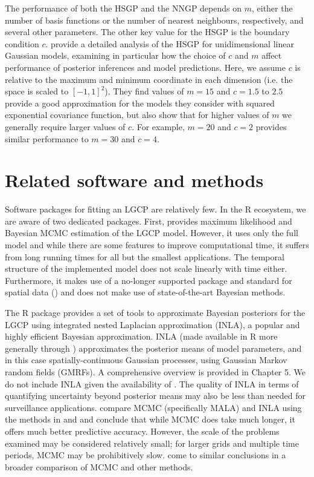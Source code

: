 The performance of both the HSGP and the NNGP depends on $m$, either the number of basis functions or the number of nearest neighbours, respectively, and several other parameters. The other key value for the HSGP is the boundary condition $c$. \citet{Riutort2023} provide a detailed analysis of the HSGP for unidimensional linear Gaussian models, examining in particular how the choice of $c$ and $m$ affect performance of posterior inferences and model predictions. Here, we assume $c$ is relative to the maximum and minimum coordinate in each dimension (i.e. the space is scaled to $[-1,1]^2$). They find values of $m=15$ and $c=1.5$ to $2.5$ provide a good approximation for the models they consider with squared exponential covariance function, but also show that for higher values of $m$ we generally require larger values of $c$. For example, $m=20$ and $c=2$ provides similar performance to $m=30$ and $c=4$. 

\section{Related software and methods}
\label{sec:software}
Software packages for fitting an LGCP are relatively few. In the R ecosystem, we are aware of two dedicated packages. First, \citep{Taylor2013,Taylor2015} provides maximum likelihood and Bayesian MCMC estimation of the LGCP model. However, it uses only the full model and while there are some features to improve computational time, it suffers from long running times for all but the smallest applications. The temporal structure of the implemented model does not scale linearly with time either. Furthermore, it makes use of a no-longer supported package and standard for spatial data () and does not make use of state-of-the-art Bayesian methods. 

The R package  \citep{Bachl2019} provides a set of tools to approximate Bayesian posteriors for the LGCP using integrated nested Laplacian approximation (INLA), a popular and highly efficient Bayesian approximation. INLA (made available in R more generally through  \citep{Lindgren2015}) approximates the posterior means of model parameters, and in this case spatially-continuous Gaussian processes, using Gaussian Markov random fields (GMRFs). A comprehensive overview is provided in \citet{Rue2005} Chapter 5. We do not include INLA given the availability of . The quality of INLA in terms of quantifying uncertainty beyond posterior means may also be less than needed for surveillance applications. \citet{Taylor2014} compare MCMC (specifically MALA) and INLA using the methods in  and  and conclude that while MCMC does take much longer, it offers much better predictive accuracy. However, the scale of the problems examined may be considered relatively small; for larger grids and multiple time periods, MCMC may be prohibitively slow. \citet{Teng2017} come to similar conclusions in a broader comparison of MCMC and other methods. 

